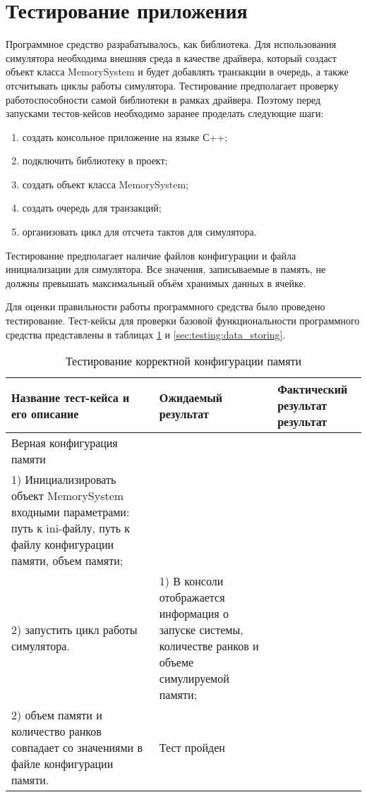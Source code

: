 \section{Тестирование приложения}
\label{sec:testing}
Программное средство разрабатывалось, как библиотека. Для использования симулятора необходима внешняя среда в качестве драйвера, который создаст объект класса MemorySystem и будет добавлять транзакции в очередь, а также отсчитывать циклы работы симулятора. Тестирование предполагает проверку работоспособности самой библиотеки в рамках драйвера. Поэтому перед запусками тестов-кейсов необходимо заранее проделать следующие шаги:
\begin{enumerate}
  \item создать консольное приложение на языке С++;
  \item подключить библиотеку в проект;
  \item создать объект класса MemorySystem;
  \item создать очередь для транзакций; 
  \item организовать цикл для отсчета тактов для симулятора.
\end{enumerate}

Тестирование предполагает наличие файлов конфигурации и файла инициализации для симулятора. Все значения, записываемые в память, не должны превышать максимальный объём хранимых данных в ячейке. 

Для оценки правильности работы программного средства было проведено тестирование. Тест-кейсы для проверки базовой функциональности программного средства представлены в таблицах \ref{sec:testing:configuration} и \ref{sec:testing:data_storing}.

\begin{longtable}[l]{| >{\raggedright}p{}
                     | >{\raggedright}p{}
                     | >{\raggedright\arraybackslash}p{}|}
  \caption{Тестирование корректной конфигурации памяти}
  \label{sec:testing:configuration} \tabularnewline

  \hline
       Название тест-кейса и его описание & Ожидаемый результат & Фактический результат результат \\
   \hline
   Верная конфигурация памяти \\ 
   1) Инициализировать объект MemorySystem входными параметрами: путь к ini-файлу, путь к файлу конфигурации памяти, объем памяти; \\ 
   2) запустить цикл работы симулятора.

   &
   1) В консоли отображается информация о запуске системы, количестве ранков и объеме симулируемой памяти; \\
   2) объем памяти и количество ранков совпадает со значениями в файле конфигурации памяти.

   & Тест пройден \\
   \hline
\end{longtable}

